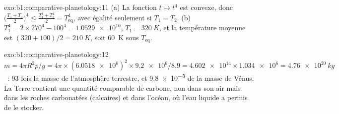\begin{solution}{exo:b1:comparative-planetology:11}
(a) La fonction $t\mapsto t^4$ est convexe, donc
$\bigl(\tfrac{T_1 + T_2}{2}\bigr)^4 \le \tfrac{T_1^4 + T_2^4}{2} =
T_\mathrm{eq}^4$, avec égalité seulement si $T_1 = T_2$. (b) $T_1^4 =
2\times270^4 - 100^4 = \num{1.0529e10}$, $T_1 = \qty{320}{K}$, et la température
moyenne est $(320 + 100)/2 = \qty{210}{K}$, soit \qty{60}{K} sous
$T_\mathrm{eq}$.
\end{solution}

\begin{solution}{exo:b1:comparative-planetology:12}
$m = 4\pi R^2p/g = 4\pi\times(\num{6.0518e6})^2\times\num{9.2e6}/8.9 =
\num{4.602e14}\times\num{1.034e6} = \qty{4.76e20}{kg}$~: 93 fois la masse de
l'atmosphère terrestre, et \num{9.8e-5} de la masse de Vénus. La Terre contient
une quantité comparable de carbone, non dans son air mais dans les roches
carbonatées (calcaires) et dans l'océan, où l'eau liquide a permis de le stocker.
\end{solution}

